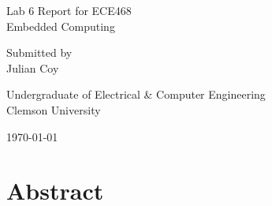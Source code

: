 \documentclass[11pt]{report}
\begin{document}
\begin{spacing}{1.5}

\thispagestyle{empty}

\begin{scshape}

\vspace*{30pt}
{
\Huge
\begin{center}
    \reporttitle
\end{center}
}
\vspace{30pt}

{
\Large
\begin{center}
  Lab 6 Report for ECE468 \\
  Embedded Computing
\end{center}
}
\vspace{30pt}
{
\Large 
\begin{center}
  Submitted by \\
  Julian Coy
\end{center}
}
\vspace{120pt}

{
\Large
\begin{center}
  Undergraduate of Electrical \& Computer Engineering \\
  Clemson University
\end{center}
}
\vspace{30pt}

{
\Large
\begin{center}
  \today
\end{center}
}

\end{scshape}

\clearpage


\vspace{15pt}
  \setcounter{chapter}{1}
  \chapter*{Abstract}
  \label{cha:abstract}
\vspace{72pt}


\end{spacing}
\end{document}
